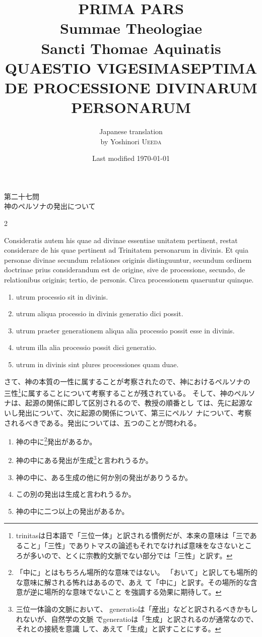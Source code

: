 \documentclass[paper=a4paper,fontsize=10pt,jafontsize=9pt,titlepage]{jlreq}
\title{{\bfseries PRIMA PARS}\\{\Huge Summae Theologiae}\\Sancti Thomae
Aquinatis\\{\sffamily QUAESTIO VIGESIMASEPTIMA}\\DE PROCESSIONE
DIVINARUM PERSONARUM}
\author{Japanese translation\\by Yoshinori {\scshape Ueeda}}
\date{Last modified \today}
\begin{document}
\maketitle

\begin{center}
{\Large 第二十七問\\神のペルソナの発出について}
\end{center}


\begin{paracol}{2}

{\Huge C}onsideratis autem his quae ad divinae essentiae unitatem pertinent,
 restat considerare de his quae pertinent ad Trinitatem personarum in
 divinis. Et quia personae divinae secundum relationes originis
 distinguuntur, secundum ordinem doctrinae prius considerandum est de
 origine, sive de processione, secundo, de relationibus originis;
 tertio, de personis. Circa processionem quaeruntur quinque. 

\begin{enumerate}
 \item utrum processio sit in divinis.
 \item utrum aliqua processio in divinis generatio dici possit.
 \item utrum praeter generationem aliqua alia processio possit esse in
       divinis.
 \item utrum illa alia processio possit dici generatio.
 \item utrum in divinis sint plures processiones quam duae.
\end{enumerate}


\switchcolumn


さて、神の本質の一性に属することが考察されたので、神におけるペルソナの
 三性\footnote{trinitasは日本語で「三位一体」と訳される慣例だが、本来の意味は「三であ
 ること」「三性」でありトマスの論述もそれでなければ意味をなさないとこ
 ろが多いので、とくに宗教的文脈でない部分では「三性」と訳す。}に属することについて考察することが残されている。
そして、神のペルソナは、起源の関係に即して区別されるので、教授の順番とし
 ては、先に起源ないし発出について、次に起源の関係について、第三にペルソ
 ナについて、考察されるべきである。発出については、五つのことが問われる。

\begin{enumerate}
 \item 神の中に\footnote{「中に」とはもちろん場所的な意味ではない。
       「おいて」と訳しても場所的な意味に解される怖れはあるので、あえ
       て「中に」と訳す。その場所的な含意が逆に場所的な意味でないこと
       を強調する効果に期待して。}発出があるか。
 \item 神の中にある発出が生成\footnote{三位一体論の文脈において、
       generatioは「産出」などと訳されるべきかもしれないが、自然学の文脈
       でgeneratioは「生成」と訳されるのが通常なので、それとの接続を意識
       して、あえて「生成」と訳すことにする。}と言われうるか。
 \item 神の中に、ある生成の他に何か別の発出がありうるか。
 \item この別の発出は生成と言われうるか。
 \item 神の中に二つ以上の発出があるか。
\end{enumerate}



\end{paracol}
\end{document}
